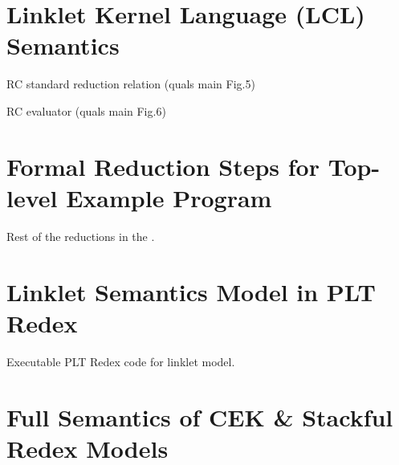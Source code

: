 \begin{appendices}



\chapter[\texorpdfstring{Linklet Kernel Language (LKL) Semantics}{Appendix A}]{Linklet Kernel Language (LCL) Semantics}
\label{appendix:linklet-kernel-language}


    \begin{figure-here}
        RC standard reduction relation (quals main Fig.5)
    \end{figure-here}

    \begin{figure-here}
        RC evaluator (quals main Fig.6)
    \end{figure-here}


\chapter[\texorpdfstring{Formal Reduction Steps for Top-level Example Program}{Appendix B}]{Formal Reduction Steps for Top-level Example Program}
\label{appendix:formal-reduction-steps-toplevel-example}

    \begin{figure-here}
        Rest of the reductions in the .
    \end{figure-here}

\chapter[\texorpdfstring{Linklet Semantics Model in PLT Redex}{Appendix C}]{Linklet Semantics Model in PLT Redex}
\label{appendix:linklet-semantics-model-redex-code}

    \begin{figure-here}
        Executable PLT Redex code for linklet model.
    \end{figure-here}

\chapter[\texorpdfstring{Full Semantics of CEK \& Stackful Redex Models}
                          {Appendix D}]{Full Semantics of CEK \& Stackful Redex Models}
\label{appendix:cek-stackful-redex}


\end{appendices}
